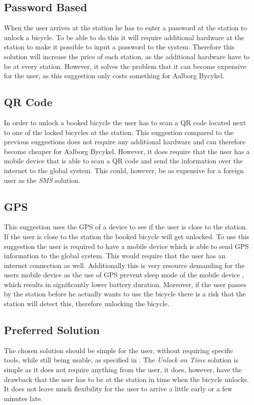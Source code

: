 \subsection{Password Based}
When the user arrives at the station he has to enter a password at the station to unlock a bicycle.
To be able to do this it will require additional hardware at the station to make it possible to input a password to the system.
Therefore this solution will increase the price of each station, as the additional hardware have to be at every station.
However, it solves the problem that it can become expensive for the user, as this suggestion only costs something for Aalborg Bycykel.

\subsection{QR Code}
In order to unlock a booked bicycle the user has to scan a QR code located next to one of the locked bicycles at the station.
This suggestion compared to the previous suggestions does not require any additional hardware and can therefore become cheaper for Aalborg Bycykel.
However, it does require that the user has a mobile device that is able to scan a QR code and send the information over the internet to the global system. This could, however, be as expensive for a foreign user as the \textit{SMS} solution.

\subsection{GPS}
This suggestion uses the GPS of a device to see if the user is close to the station.
If the user is close to the station the booked bicycle will get unlocked.
To use this suggestion the user is required to have a mobile device which is able to send GPS information to the global system.
This would require that the user has an internet connection as well.
Additionally this is very resource demanding for the users mobile device as the use of GPS prevent sleep mode of the mobile device \citep{misc:gpsbatteryusage}, which results in significantly lower battery duration.
Moreover, if the user passes by the station before he actually wants to use the bicycle there is a risk that the station will detect this, therefore unlocking the bicycle.

\subsection{Preferred Solution}
The chosen solution should be simple for the user, without requiring specific tools, while still being usable, as specified in .
The \textit{Unlock on Time} solution is simple as it does not require anything from the user, it does, however, have the drawback that the user has to be at the station in time when the bicycle unlocks.
It does not leave much flexibility for the user to arrive a little early or a few minutes late.

